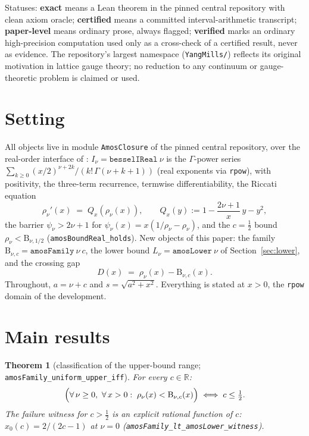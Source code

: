 \documentclass[11pt]{article}
\newtheorem{theorem}{Theorem}[section]
\newcommand{\lean}[1]{\texttt{#1}}
\newcommand{\Bfam}{\mathrm{B}}
\begin{document}
Statuses: \textbf{exact} means a Lean theorem in the pinned central
repository with clean axiom oracle; \textbf{certified} means a
committed interval-arithmetic transcript; \textbf{paper-level}
means ordinary prose, always flagged; \textbf{verified} marks an
ordinary high-precision computation used only as a cross-check of a
certified result, never as evidence.  The repository's largest
namespace (\lean{YangMills/}) reflects its original motivation in
lattice gauge theory; no reduction to any continuum or
gauge-theoretic problem is claimed or used.

\section{Setting}\label{sec:setting}

All objects live in module \lean{AmosClosure} of the pinned central
repository, over the real-order interface of \cite{ErikssonC4}:
$I_\nu = \lean{besselIReal}\ \nu$ is the $\Gamma$-power series
$\sum_{k\ge0}(x/2)^{\nu+2k}/(k!\,\Gamma(\nu+k+1))$ (real exponents
via \lean{rpow}), with positivity, the three-term recurrence,
termwise differentiability, the Riccati equation
\begin{equation}\label{eq:riccati}
\rho_\nu'(x) \;=\; Q_x(\rho_\nu(x)), \qquad
Q_x(y) := 1 - \frac{2\nu+1}{x}\,y - y^2,
\end{equation}
the barrier $\psi_\nu > 2\nu+1$ for
$\psi_\nu(x) = x(1/\rho_\nu - \rho_\nu)$, and the $c=\tfrac12$
bound $\rho_\nu < \Bfam_{\nu,1/2}$ (\lean{amosBoundReal\_holds}).
New objects of this paper: the family
$\Bfam_{\nu,c} = \lean{amosFamily}\ \nu\ c$, the lower bound
$L_\nu = \lean{amosLower}\ \nu$ of Section~\ref{sec:lower}, and the
crossing gap
\[
D(x) \;=\; \rho_\nu(x) - \Bfam_{\nu,c}(x).
\]
Throughout, $a = \nu+c$ and $s = \sqrt{a^2+x^2}$.  Everything is
stated at $x > 0$, the \lean{rpow} domain of the development.

\section{Main results}\label{sec:results}

\begin{theorem}[classification of the upper-bound range;
\lean{amosFamily\_uniform\_upper\_iff}]\label{thm:classification}
For every $c \in \mathbb{R}$:
\[
\Bigl(\forall\, \nu \ge 0,\ \forall\, x > 0:\;
\rho_\nu(x) < \Bfam_{\nu,c}(x)\Bigr)
\;\Longleftrightarrow\;
c \le \tfrac12 .
\]
The failure witness for $c > \tfrac12$ is an explicit rational function of $c$:
$x_0(c) = 2/(2c-1)$ at $\nu = 0$
(\lean{amosFamily\_lt\_amosLower\_witness}).
\end{theorem}
\end{document}
